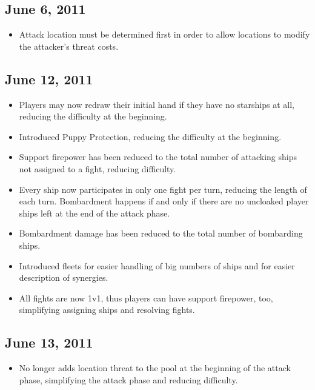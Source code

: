 \documentclass[11pt, a4paper]{article}
\begin{document}
\subsection{June 6, 2011}

\begin{itemize}
 \item Attack location must be determined first in order to allow locations to
modify the attacker's threat costs.
\end{itemize}

\subsection{June 12, 2011}

\begin{itemize}
 \item Players may now redraw their initial hand if they have no starships at
all, reducing the difficulty at the beginning.
 \item Introduced Puppy Protection, reducing the difficulty at the beginning.
 \item Support firepower has been reduced to the total number of attacking ships
not assigned to a fight, reducing difficulty.
 \item Every ship now participates in only one fight per turn, reducing the
length of each turn. Bombardment happens if and only if there are no uncloaked
player ships left at the end of the attack phase.
 \item Bombardment damage has been reduced to the total number of bombarding
ships.
 \item Introduced fleets for easier handling of big numbers of ships and for
easier description of synergies.
 \item All fights are now 1v1, thus players can have support firepower, too,
simplifying assigning ships and resolving fights.
\end{itemize}

\subsection{June 13, 2011}

\begin{itemize}
 \item No longer adds location threat to the pool at the beginning of the attack
phase, simplifying the attack phase and reducing difficulty.
\end{itemize}
\end{document}
